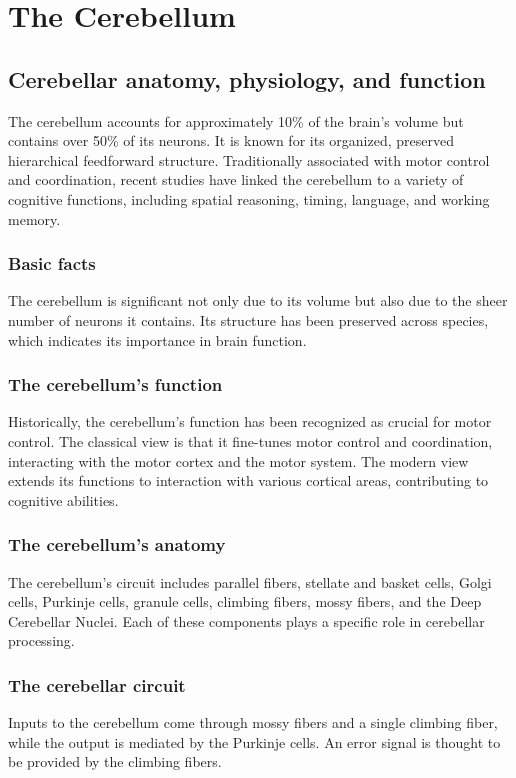 \documentclass[11pt]{book} %
\begin{document}
\section{The Cerebellum}

\subsection{Cerebellar anatomy, physiology, and function}
The cerebellum accounts for approximately 10\% of the brain's volume but contains over 50\% of its neurons. It is known for its organized, preserved hierarchical feedforward structure. Traditionally associated with motor control and coordination, recent studies have linked the cerebellum to a variety of cognitive functions, including spatial reasoning, timing, language, and working memory.

\subsubsection{Basic facts}
The cerebellum is significant not only due to its volume but also due to the sheer number of neurons it contains. Its structure has been preserved across species, which indicates its importance in brain function.

\subsubsection{The cerebellum's function}
Historically, the cerebellum's function has been recognized as crucial for motor control. The classical view is that it fine-tunes motor control and coordination, interacting with the motor cortex and the motor system. The modern view extends its functions to interaction with various cortical areas, contributing to cognitive abilities.

\subsubsection{The cerebellum's anatomy}
The cerebellum's circuit includes parallel fibers, stellate and basket cells, Golgi cells, Purkinje cells, granule cells, climbing fibers, mossy fibers, and the Deep Cerebellar Nuclei. Each of these components plays a specific role in cerebellar processing.

\subsubsection{The cerebellar circuit}
Inputs to the cerebellum come through mossy fibers and a single climbing fiber, while the output is mediated by the Purkinje cells. An error signal is thought to be provided by the climbing fibers.
\end{document}
